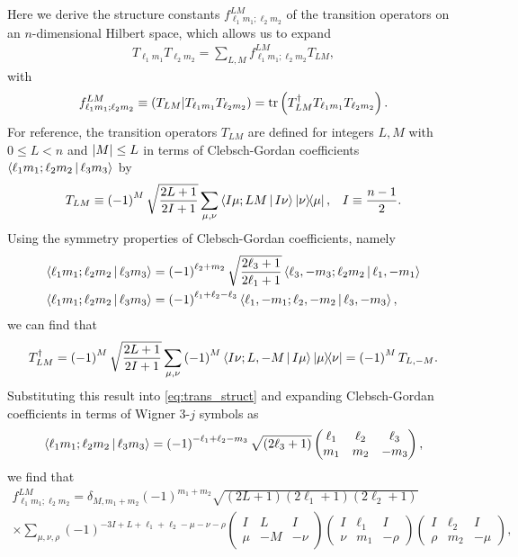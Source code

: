 \documentclass[nofootinbib,notitlepage,11pt]{revtex4-2}
\newcommand{\f}[2]{\dfrac{#1}{#2}} %
\newcommand{\p}[1]{\left(#1\right)} %
\newcommand{\bk}{\Braket} %
\newcommand{\1}{\mathds{1}}
\def\obk#1{\mathinner{({#1})}}
\begin{document}
Here we derive the structure constants
$f_{\ell_1 m_1;\ell_2 m_2}^{LM}$ of the transition operators on an
$n$-dimensional Hilbert space, which allows us to expand
\begin{align}
  T_{\ell_1 m_1} T_{\ell_2 m_2}
  = \sum_{L,M} f_{\ell_1 m_1;\ell_2 m_2}^{LM} T_{LM},
\end{align}
with
\begin{align}
  f_{\ell_1 m_1;\ell_2 m_2}^{LM}
  \equiv \obk{T_{LM} | T_{\ell_1 m_1} T_{\ell_2 m_2}}
  = \tr\p{T_{LM}^\dag T_{\ell_1 m_1} T_{\ell_2 m_2}}.
  \label{eq:trans_struct}
\end{align}
For reference, the transition operators $T_{LM}$ are defined for
integers $L,M$ with $0\le L<n$ and $\abs{M}\le L$ in terms of
Clebsch-Gordan coefficients $\bk{\ell_1 m_1;\ell_2 m_2|\ell_3 m_3}$ by
\begin{align}
  T_{LM} \equiv \p{-1}^M \sqrt{\f{2L+1}{2I+1}}
  \sum_{\mu,\nu} \bk{I\mu;LM|I\nu} \op{\nu}{\mu},
  &&
  I \equiv \f{n-1}{2}.
\end{align}
Using the symmetry properties of Clebsch-Gordan coefficients, namely
\begin{align}
  \bk{\ell_1 m_1; \ell_2 m_2| \ell_3 m_3}
  &= \p{-1}^{\ell_2+m_2} \sqrt{\f{2\ell_3+1}{2\ell_1+1}}
  \bk{\ell_3,-m_3; \ell_2 m_2| \ell_1,-m_1} \\
  \bk{\ell_1 m_1; \ell_2 m_2| \ell_3 m_3}
  &= \p{-1}^{\ell_1+\ell_2-\ell_3}
  \bk{\ell_1,-m_1; \ell_2,-m_2| \ell_3,-m_3},
\end{align}
we can find that
\begin{align}
  T_{LM}^\dag
  = \p{-1}^M \sqrt{\f{2L+1}{2I+1}}
  \sum_{\mu,\nu} \p{-1}^M \bk{I\nu;L,-M|I\mu} \op{\mu}{\nu}
  = \p{-1}^M T_{L,-M}.
\end{align}
Substituting this result into \eqref{eq:trans_struct} and expanding
Clebsch-Gordan coefficients in terms of Wigner 3-$j$ symbols as
\begin{align}
  \bk{\ell_1 m_1; \ell_2 m_2| \ell_3 m_3}
  = \p{-1}^{-\ell_1+\ell_2-m_3} \sqrt{\p{2\ell_3+1}}
  \begin{pmatrix}
    \ell_1 & \ell_2 & \ell_3 \\
    m_1 & m_2 & -m_3
  \end{pmatrix},
\end{align}
we find that
\begin{multline}
  f_{\ell_1 m_1;\ell_2 m_2}^{LM}
  = \delta_{M,m_1+m_2}
  \p{-1}^{m_1+m_2} \sqrt{\p{2L+1}\p{2\ell_1+1}\p{2\ell_2+1}} \\
  \times \sum_{\mu,\nu,\rho} \p{-1}^{-3I+L+\ell_1+\ell_2-\mu-\nu-\rho}
  \begin{pmatrix}
    I & L & I \\
    \mu & -M & -\nu
  \end{pmatrix}
  \begin{pmatrix}
    I & \ell_1 & I \\
    \nu & m_1 & -\rho
  \end{pmatrix}
  \begin{pmatrix}
    I & \ell_2 & I \\
    \rho & m_2 & -\mu
  \end{pmatrix},
\end{multline}
\end{document}
